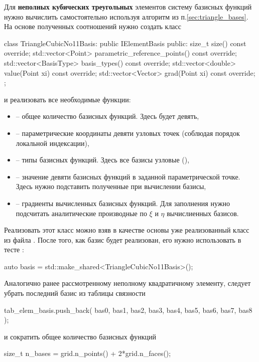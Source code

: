 Для {\bf неполных кубических треугольных} элементов систему базисных функций нужно
вычислить самостоятельно используя алгоритм из п.\ref{sec:triangle_bases}.
На основе полученных соотношений нужно создать класс
\begin{cppcode}
class TriangleCubicNo11Basis: public IElementBasis{
public:
	size_t size() const override;
	std::vector<Point> parametric_reference_points() const override;
	std::vector<BasisType> basis_types() const override;
	std::vector<double> value(Point xi) const override;
	std::vector<Vector> grad(Point xi) const override;
};
\end{cppcode}
и реализовать все необходимые функции:
\begin{itemize}
\item {} -- общее количество базисных функций. Здесь будет девять,
\item {} -- параметрические координаты девяти узловых точек (соблюдая порядок локальной индексации),
\item {} -- типы базисных функций. Здесь все базисы узловые (),
\item {} -- значение девяти базисных функций в заданной параметрической точке. Здесь нужно подставить полученные при вычислении базисы,
\item {} -- градиенты вычисленных базисных функций. Для заполнения нужно подсчитать аналитические производные по $\xi$ и $\eta$ вычислиенных базисов.
\end{itemize}
Реализовать этот класс можно взяв в качестве основы уже реализованный класс  из файла .
После того, как базис будет реализован, его нужно использовать в тесте :
\begin{cppcode}
auto basis = std::make_shared<TriangleCubicNo11Basis>();
\end{cppcode}
Аналогично ранее рассмотренному неполному квадратичному элементу,
следует убрать последний базис из таблицы связности
\begin{cppcode}
tab_elem_basis.push_back({
	bas0, bas1, bas2,
	bas3, bas4, bas5, bas6, bas7, bas8
});
\end{cppcode}
и сократить общее количество базисных функций
\begin{cppcode}
size_t n_bases = grid.n_points() + 2*grid.n_faces();
\end{cppcode}
